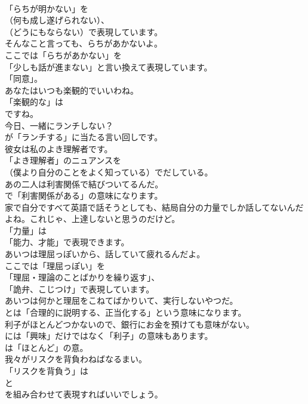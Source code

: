 \documentclass[8pt]{extreport}
\begin{document}
\begin{CJK}{UTF8}{min}
\\	「らちが明かない」を 
\\	（何も成し遂げられない）、
\\	（どうにもならない）で表現しています。	
\\	そんなこと言っても、らちがあかないよ。 
\\	ここでは「らちがあかない」を
\\	「少しも話が進まない」と言い換えて表現しています。
\\	「同意」。	
\\	あなたはいつも楽観的でいいわね。 
\\	「楽観的な」は
\\	ですね。	
\\	今日、一緒にランチしない？ 
\\	が「ランチする」に当たる言い回しです。	
\\	彼女は私のよき理解者です。 
\\	「よき理解者」のニュアンスを
\\	（僕より自分のことをよく知っている）でだしている。	
\\	あの二人は利害関係で結びついてるんだ。 
\\	で「利害関係がある」の意味になります。	
\\	家で自分ですべて英語で話そうとしても、結局自分の力量でしか話してないんだよね。これじゃ、上達しないと思うのだけど。 
\\	「力量」は
\\	「能力、才能」で表現できます。	
\\	あいつは理屈っぽいから、話していて疲れるんだよ。 
\\	ここでは「理屈っぽい」を
\\	「理屈・理論のことばかりを繰り返す」、
\\	「詭弁、こじつけ」で表現しています。	
\\	あいつは何かと理屈をこねてばかりいて、実行しないやつだ。 
\\	とは「合理的に説明する、正当化する」という意味になります。	
\\	利子がほとんどつかないので、銀行にお金を預けても意味がない。 
\\	には「興味」だけではなく「利子」の意味もあります。
\\	は「ほとんど」の意。	
\\	我々がリスクを背負わねばなるまい。 
\\	「リスクを背負う」は 
\\	と 
\\	を組み合わせて表現すればいいでしょう。	

\end{CJK}
\end{document}
